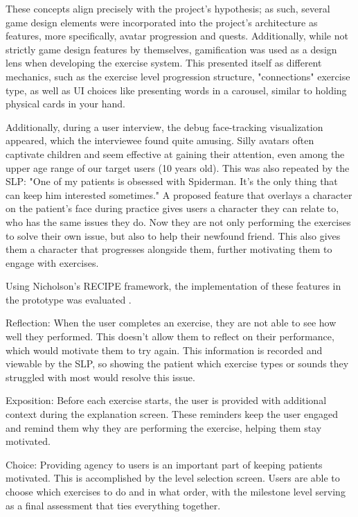These concepts align precisely with the project's hypothesis; as such, several game design elements were incorporated into the project's architecture as features, more specifically, avatar progression and quests. Additionally, while not strictly game design features by themselves, gamification was used as a design lens when developing the exercise system. This presented itself as different mechanics, such as the exercise level progression structure, "connections" exercise type, as well as UI choices like presenting words in a carousel, similar to holding physical cards in your hand.

Additionally, during a user interview, the debug face-tracking visualization appeared, which the interviewee found quite amusing. Silly avatars often captivate children and seem effective at gaining their attention, even among the upper age range of our target users (10 years old). This was also repeated by the SLP: "One of my patients is obsessed with Spiderman. It's the only thing that can keep him interested sometimes." A proposed feature that overlays a character on the patient's face during practice gives users a character they can relate to, who has the same issues they do. Now they are not only performing the exercises to solve their own issue, but also to help their newfound friend. This also gives them a character that progresses alongside them, further motivating them to engage with exercises.

Using Nicholson's RECIPE framework, the implementation of these features in the prototype was evaluated \cite{nicholson2015recipe}.

Reflection: When the user completes an exercise, they are not able to see how well they performed. This doesn't allow them to reflect on their performance, which would motivate them to try again. This information is recorded and viewable by the SLP, so showing the patient which exercise types or sounds they struggled with most would resolve this issue.

Exposition: Before each exercise starts, the user is provided with additional context during the explanation screen. These reminders keep the user engaged and remind them why they are performing the exercise, helping them stay motivated.

Choice: Providing agency to users is an important part of keeping patients motivated. This is accomplished by the level selection screen. Users are able to choose which exercises to do and in what order, with the milestone level serving as a final assessment that ties everything together.

